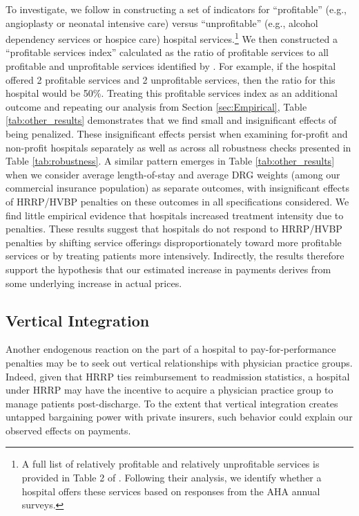 \documentclass[12pt]{article}
\begin{document}
To investigate, we follow \cite{horwitz2009} in constructing a set of indicators for ``profitable'' (e.g., angioplasty or neonatal intensive care) versus ``unprofitable'' (e.g., alcohol dependency services or hospice care) hospital services.\footnote{A full list of relatively profitable and relatively unprofitable services is provided in Table 2 of \cite{horwitz2009}. Following their analysis, we identify whether a hospital offers these services based on responses from the AHA annual surveys.} We then constructed a ``profitable services index'' calculated as the ratio of profitable services to all profitable and unprofitable services identified by \cite{horwitz2009}. For example, if the hospital offered 2 profitable services and 2 unprofitable services, then the ratio for this hospital would be 50\%. Treating this profitable services index as an additional outcome and repeating our analysis from Section \ref{sec:Empirical}, Table \ref{tab:other_results} demonstrates that we find small and insignificant effects of being penalized. These insignificant effects persist when examining for-profit and non-profit hospitals separately as well as across all robustness checks presented in Table \ref{tab:robustness}.  A similar pattern emerges in Table \ref{tab:other_results} when we consider average length-of-stay and average DRG weights (among our commercial insurance population) as separate outcomes, with insignificant effects of HRRP/HVBP penalties on these outcomes in all specifications considered.  We find little empirical evidence that hospitals increased treatment intensity due to penalties.  These results suggest that hospitals do not respond to HRRP/HVBP penalties by shifting service offerings disproportionately toward more profitable services or by treating patients more intensively. Indirectly, the results therefore support the hypothesis that our estimated increase in payments derives from some underlying increase in actual prices.


\subsection{Vertical Integration}
Another endogenous reaction on the part of a hospital to pay-for-performance penalties may be to seek out vertical relationships with physician practice groups.  Indeed, given that HRRP ties reimbursement to readmission statistics, a hospital under HRRP may have the incentive to acquire a physician practice group to manage patients post-discharge.  To the extent that vertical integration creates untapped bargaining power with private insurers, such behavior could explain our observed effects on payments.  
\end{document}
